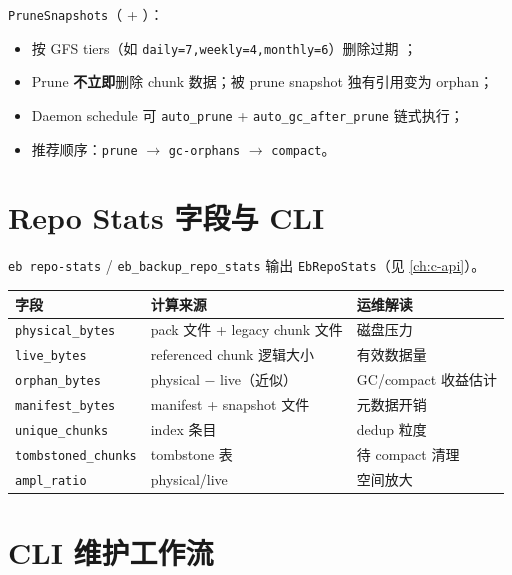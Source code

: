 \texttt{PruneSnapshots}（ + ）：

\begin{itemize}[nosep]
  \item 按 GFS tiers（如 \texttt{daily=7,weekly=4,monthly=6}）删除过期 ；
  \item Prune \textbf{不立即}删除 chunk 数据；被 prune snapshot 独有引用变为 orphan；
  \item Daemon schedule 可 \texttt{auto\_prune} + \texttt{auto\_gc\_after\_prune} 链式执行；
  \item 推荐顺序：\texttt{prune} $\rightarrow$ \texttt{gc-orphans} $\rightarrow$ \texttt{compact}。
\end{itemize}

\section{Repo Stats 字段与 CLI}

\texttt{eb repo-stats} / \texttt{eb\_backup\_repo\_stats} 输出 \texttt{EbRepoStats}（见 \cref{ch:c-api}）。

\begin{longtable}{@{}llp{7.5cm}@{}}
\toprule
字段 & 计算来源 & 运维解读 \\
\midrule
\texttt{physical\_bytes} & pack 文件 + legacy chunk 文件 & 磁盘压力 \\
\texttt{live\_bytes} & referenced chunk 逻辑大小 & 有效数据量 \\
\texttt{orphan\_bytes} & physical $-$ live（近似） & GC/compact 收益估计 \\
\texttt{manifest\_bytes} & manifest + snapshot 文件 & 元数据开销 \\
\texttt{unique\_chunks} & index 条目 & dedup 粒度 \\
\texttt{tombstoned\_chunks} & tombstone 表 & 待 compact 清理 \\
\texttt{ampl\_ratio} & physical/live & 空间放大 \\
\bottomrule
\end{longtable}

\section{CLI 维护工作流}


